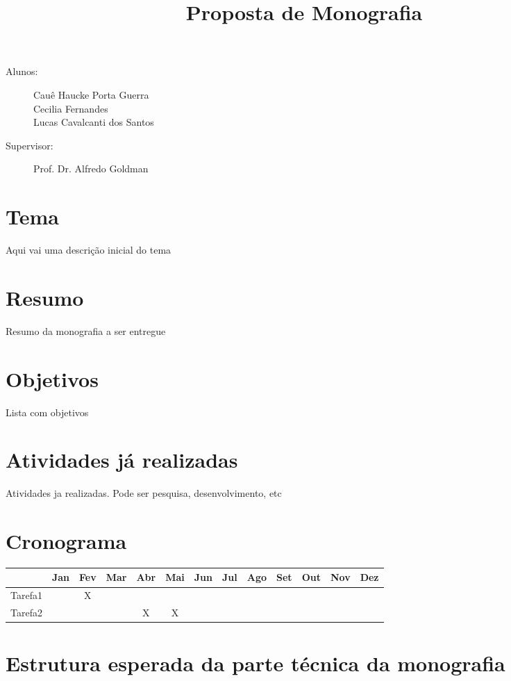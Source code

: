 \documentclass[titlepage]{article}
\title{Proposta de Monografia}
\author{}
\begin{document}
\maketitle

\begin{description} 
\item[Alunos:]Cauê Haucke Porta Guerra\\Cecilia Fernandes\\Lucas Cavalcanti dos Santos
\item[Supervisor: ] Prof. Dr. Alfredo Goldman
\end{description}

\section{Tema}
Aqui vai uma descrição inicial do tema

\section{Resumo}
Resumo da monografia a ser entregue

\section{Objetivos}
Lista com objetivos

\section{Atividades já realizadas}
Atividades ja realizadas. Pode ser pesquisa, desenvolvimento, etc

\section{Cronograma}
\begin{tabular}{|l|c|c|c|c|c|c|c|c|c|c|c|c|}
  \hline
  & Jan & Fev & Mar & Abr & Mai & Jun & Jul & Ago & Set & Out & Nov & Dez \\ \hline
	Tarefa1 & & X & & & & & & & & & & \\ \hline
  Tarefa2 & & & & X & X & & & & & & &\\
  \hline
\end{tabular}

\section{Estrutura esperada da parte técnica da monografia}
\end{document}
